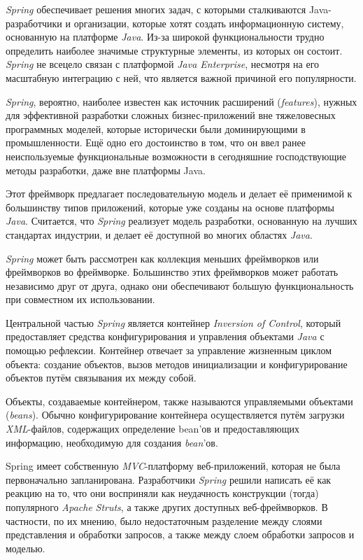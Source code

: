 \textit{Spring} обеспечивает решения многих задач, с которыми сталкиваются Java-разработчики и организации, которые хотят создать информационную систему, основанную на платформе \textit{Java}. Из-за широкой функциональности трудно определить наиболее значимые структурные элементы, из которых он состоит. \textit{Spring} не всецело связан с платформой \textit{Java Enterprise}, несмотря на его масштабную интеграцию с ней, что является важной причиной его популярности.

\textit{Spring}, вероятно, наиболее известен как источник расширений (\textit{features}), нужных для эффективной разработки сложных бизнес-приложений вне тяжеловесных программных моделей, которые исторически были доминирующими в промышленности. Ещё одно его достоинство в том, что он ввел ранее неиспользуемые функциональные возможности в сегодняшние господствующие методы разработки, даже вне платформы Java.

Этот фреймворк предлагает последовательную модель и делает её применимой к большинству типов приложений, которые уже созданы на основе платформы \textit{Java}. Считается, что \textit{Spring} реализует модель разработки, основанную на лучших стандартах индустрии, и делает её доступной во многих областях \textit{Java}.

\textit{Spring} может быть рассмотрен как коллекция меньших фреймворков или фреймворков во фреймворке. Большинство этих фреймворков может работать независимо друг от друга, однако они обеспечивают большую функциональность при совместном их использовании.

Центральной частью \textit{Spring} является контейнер \textit{Inversion of Control}, который предоставляет средства конфигурирования и управления объектами \textit{Java} с помощью рефлексии. Контейнер отвечает за управление жизненным циклом объекта: создание объектов, вызов методов инициализации и конфигурирование объектов путём связывания их между собой.

Объекты, создаваемые контейнером, также называются управляемыми объектами (\textit{beans}). Обычно конфигурирование контейнера осуществляется путём загрузки \textit{XML}-файлов, содержащих определение bean’ов и предоставляющих информацию, необходимую для создания \textit{bean}’ов.

Spring имеет собственную \textit{MVC}-платформу веб-приложений, которая не была первоначально запланирована. Разработчики \textit{Spring} решили написать её как реакцию на то, что они восприняли как неудачность конструкции (тогда) популярного \textit{Apache} \textit{Struts}, а также других доступных веб-фреймворков. В частности, по их мнению, было недостаточным разделение между слоями представления и обработки запросов, а также между слоем обработки запросов и моделью.

